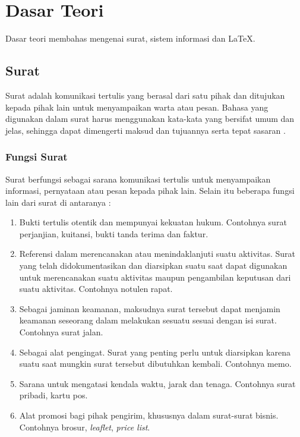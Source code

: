 \chapter{Dasar Teori}
\label{chap:dasar_teori}
Dasar teori membahas mengenai surat, sistem informasi dan \LaTeX.

\section{Surat}
\label{sec:surat}
Surat adalah komunikasi tertulis yang berasal dari satu pihak dan ditujukan kepada pihak lain untuk menyampaikan warta atau pesan. Bahasa yang digunakan dalam surat harus menggunakan kata-kata yang bersifat umum dan jelas, sehingga dapat dimengerti maksud dan tujuannya serta tepat sasaran \cite{Saiman:2002}.

\subsection{Fungsi Surat}
\label{sec:fungsi_surat}
Surat berfungsi sebagai sarana komunikasi tertulis untuk menyampaikan informasi, pernyataan atau pesan kepada pihak lain. Selain itu beberapa fungsi lain dari surat di antaranya \cite{Saiman:2002}:
\begin{enumerate}
	\item Bukti tertulis otentik dan mempunyai kekuatan hukum. Contohnya surat perjanjian, kuitansi, bukti tanda terima dan faktur.
	\item Referensi dalam merencanakan atau menindaklanjuti suatu aktivitas. Surat yang telah didokumentasikan dan diarsipkan suatu saat dapat digunakan untuk merencanakan suatu aktivitas maupun pengambilan keputusan dari suatu aktivitas. Contohnya notulen rapat.
	\item Sebagai jaminan keamanan, maksudnya surat tersebut dapat menjamin keamanan seseorang dalam melakukan sesuatu sesuai dengan isi surat. Contohnya surat jalan.
	\item Sebagai alat pengingat. Surat yang penting perlu untuk diarsipkan karena suatu saat mungkin surat tersebut dibutuhkan kembali. Contohnya memo.
	\item Sarana untuk mengatasi kendala waktu, jarak dan tenaga. Contohnya surat pribadi, kartu pos. 
	\item Alat promosi bagi pihak pengirim, khususnya dalam surat-surat bisnis. Contohnya brosur, \textit{leaflet}, \textit{price list}.
\end{enumerate}

